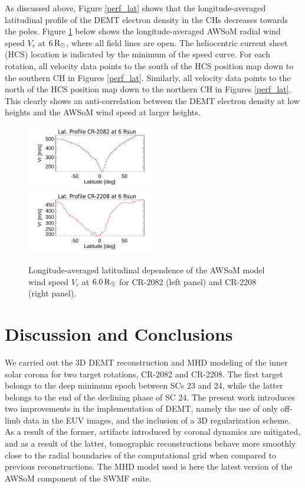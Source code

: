 \documentclass[namedreferences]{solarphysics}
\newcommand{\mrsun}{{\rm R_\odot}}
\begin{document}
\begin{article}
{As discussed above, Figure \ref{perf_lat} shows that the longitude-averaged latitudinal profile of the DEMT electron density in the CHs decreases towards the poles. Figure \ref{perf_lon_vr} below shows the longitude-averaged AWSoM radial wind speed $V_r$ at $6\,\mrsun$, where all field lines are open. The heliocentric current sheet (HCS) location is indicated by the minimum of the speed curve. For each rotation, all velocity data points to the south of the HCS position map down to the southern CH in Figures \ref{perf_lat}. Similarly, all velocity data points to the north of the HCS position map down to the northern CH in Figures \ref{perf_lat}. This clearly shows an anti-correlation between the DEMT electron density at low heights and the AWSoM wind speed at larger heights.}

\begin{figure}[h!]
\begin{center}
\includegraphics[width=0.495\textwidth]{figs/Perfil_Vr_2082_5995_2.pdf}
\includegraphics[width=0.495\textwidth]{figs/Perfil_Vr_2208_5995_2.pdf}
\caption{{Longitude-averaged latitudinal dependence of the AWSoM model {wind speed $V_r$} at $6.0\,\mrsun$ for CR-2082 (left panel) and CR-2208 (right panel).}}
\label{perf_lon_vr}
\end{center}
\end{figure}

\section{{Discussion and Conclusions}}\label{discu} 

{We carried out the 3D DEMT reconstruction and MHD modeling of the inner solar corona for two target rotations, CR-2082 and CR-2208. The first target belongs to the deep minimum epoch between SCs 23 and 24, while the latter belongs to the end of the declining phase of SC 24. The present work introduces two improvements in the implementation of DEMT, namely the use of only off-limb data in the EUV images, and the inclusion of a 3D regularization scheme. As a result of the former, artifacts introduced by coronal dynamics are mitigated, and as a result of the latter, tomographic reconstructions behave more smoothly close to the radial boundaries of the computational grid when compared to previous reconstructions. The MHD model used is here the latest version of the AWSoM component of the SWMF suite.}


\end{article}
\end{document}
